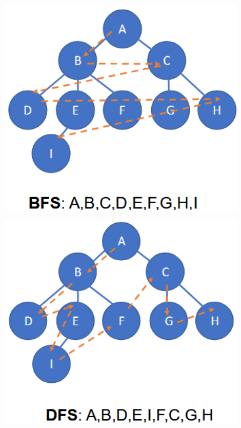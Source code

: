 \documentclass[
../../EiKI_Summary.tex,
]
{subfiles}
\begin{document}
\begin{minipage}
    [t]{0.45\textwidth}
    \centering
    \includegraphics[width=0.9\textwidth]{Pics/3/BFSTraversal.png}
\end{minipage}
\hfill
\begin{minipage}
    [t]{0.45\textwidth}
    \centering
    \includegraphics[width=0.9\textwidth]{Pics/3/DFSTraversal.png}
\end{minipage}
\end{document}
